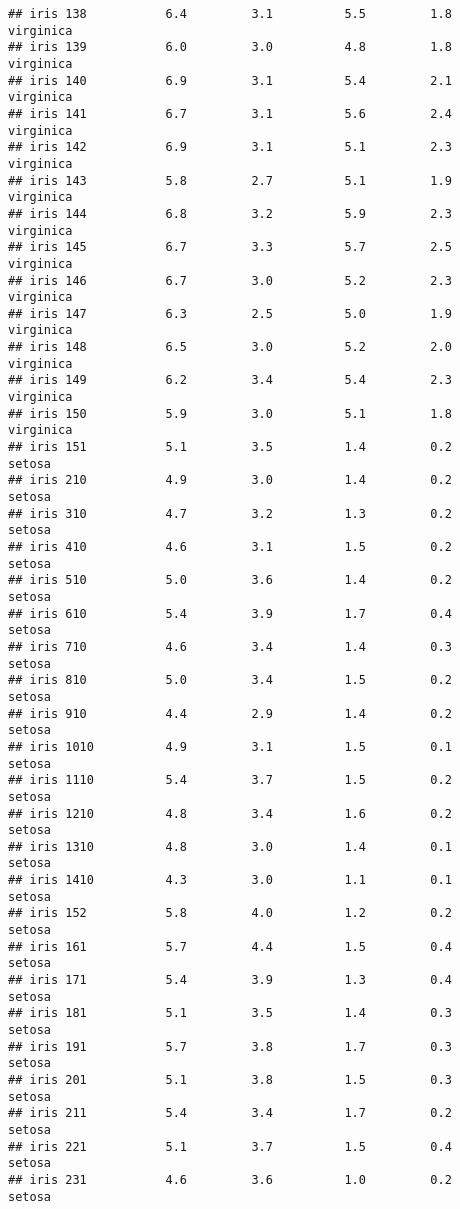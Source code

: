 \documentclass[
]{article}
\begin{document}
\begin{verbatim}
## iris 138           6.4         3.1          5.5         1.8  virginica
## iris 139           6.0         3.0          4.8         1.8  virginica
## iris 140           6.9         3.1          5.4         2.1  virginica
## iris 141           6.7         3.1          5.6         2.4  virginica
## iris 142           6.9         3.1          5.1         2.3  virginica
## iris 143           5.8         2.7          5.1         1.9  virginica
## iris 144           6.8         3.2          5.9         2.3  virginica
## iris 145           6.7         3.3          5.7         2.5  virginica
## iris 146           6.7         3.0          5.2         2.3  virginica
## iris 147           6.3         2.5          5.0         1.9  virginica
## iris 148           6.5         3.0          5.2         2.0  virginica
## iris 149           6.2         3.4          5.4         2.3  virginica
## iris 150           5.9         3.0          5.1         1.8  virginica
## iris 151           5.1         3.5          1.4         0.2     setosa
## iris 210           4.9         3.0          1.4         0.2     setosa
## iris 310           4.7         3.2          1.3         0.2     setosa
## iris 410           4.6         3.1          1.5         0.2     setosa
## iris 510           5.0         3.6          1.4         0.2     setosa
## iris 610           5.4         3.9          1.7         0.4     setosa
## iris 710           4.6         3.4          1.4         0.3     setosa
## iris 810           5.0         3.4          1.5         0.2     setosa
## iris 910           4.4         2.9          1.4         0.2     setosa
## iris 1010          4.9         3.1          1.5         0.1     setosa
## iris 1110          5.4         3.7          1.5         0.2     setosa
## iris 1210          4.8         3.4          1.6         0.2     setosa
## iris 1310          4.8         3.0          1.4         0.1     setosa
## iris 1410          4.3         3.0          1.1         0.1     setosa
## iris 152           5.8         4.0          1.2         0.2     setosa
## iris 161           5.7         4.4          1.5         0.4     setosa
## iris 171           5.4         3.9          1.3         0.4     setosa
## iris 181           5.1         3.5          1.4         0.3     setosa
## iris 191           5.7         3.8          1.7         0.3     setosa
## iris 201           5.1         3.8          1.5         0.3     setosa
## iris 211           5.4         3.4          1.7         0.2     setosa
## iris 221           5.1         3.7          1.5         0.4     setosa
## iris 231           4.6         3.6          1.0         0.2     setosa

\end{verbatim}
\end{document}
